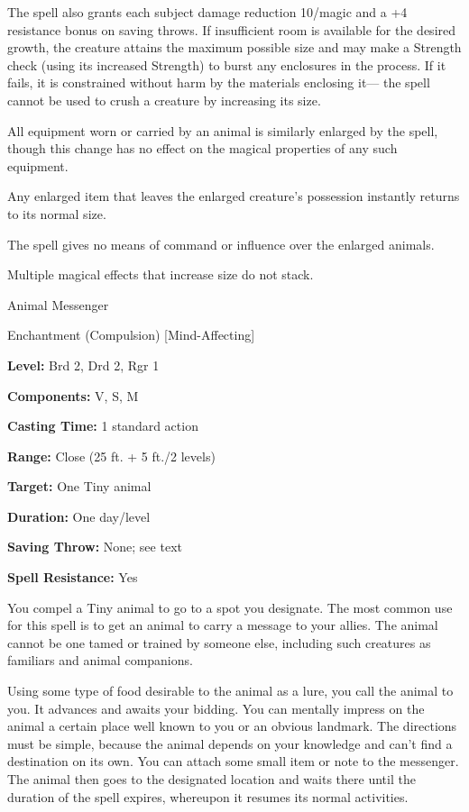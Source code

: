 \documentclass{article}
\begin{document}
The spell also grants each subject damage reduction 10/magic and a +4 resistance 
bonus on saving throws. If insufficient room is available for the desired growth, 
the creature attains the maximum possible size and may make a Strength check (using 
its increased Strength) to burst any enclosures in the process. If it fails, it 
is constrained without harm by the materials enclosing it--- the spell cannot be 
used to crush a creature by increasing its size.

All equipment worn or carried by an animal is similarly enlarged by the spell, 
though this change has no effect on the magical properties of any such equipment.

Any enlarged item that leaves the enlarged creature's possession instantly returns 
to its normal size.

The spell gives no means of command or influence over the enlarged animals.

Multiple magical effects that increase size do not stack.

\vspace{12pt}
Animal Messenger

Enchantment (Compulsion) [Mind-Affecting]

\textbf{Level:} Brd 2, Drd 2, Rgr 1

\textbf{Components:} V, S, M

\textbf{Casting Time:} 1 standard action

\textbf{Range:} Close (25 ft. + 5 ft./2 levels)

\textbf{Target:} One Tiny animal

\textbf{Duration:} One day/level

\textbf{Saving Throw:} None; see text

\textbf{Spell Resistance:} Yes

You compel a Tiny animal to go to a spot you designate. The most common use for 
this spell is to get an animal to carry a message to your allies. The animal cannot 
be one tamed or trained by someone else, including such creatures as familiars 
and animal companions.

Using some type of food desirable to the animal as a lure, you call the animal 
to you. It advances and awaits your bidding. You can mentally impress on the animal 
a certain place well known to you or an obvious landmark. The directions must be 
simple, because the animal depends on your knowledge and can't find a destination 
on its own. You can attach some small item or note to the messenger. The animal 
then goes to the designated location and waits there until the duration of the 
spell expires, whereupon it resumes its normal activities.
\end{document}
